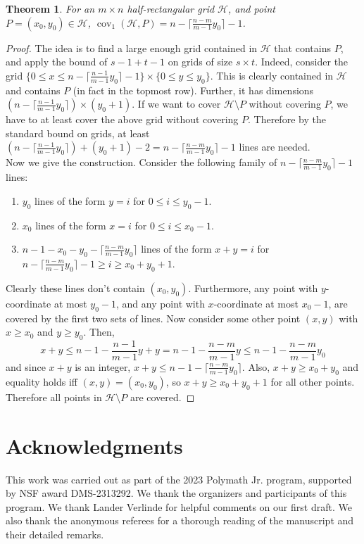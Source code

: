 \documentclass[usenames,dvipsnames, 11pt]{article}
\newtheorem{thm}{Theorem}
\numberwithin{thm}{section}
\theoremstyle{definition}
\theoremstyle{definition}
\theoremstyle{definition}
\newcommand{\cov}[1]{\operatorname{cov}_{#1}}
\newcommand{\1}{\mathbf{1}}
\def\cH{{\mathcal H}}
\begin{document}
\begin{thm}
    For an $m \times n$ half-rectangular grid $\cH$, and point $P=(x_0,y_0) \in \cH$, $\cov{1}(\cH, P)=n-\lceil \frac{n-m}{m-1} y_0 \rceil -1$.
\end{thm}
\begin{proof}
    The idea is to find a large enough grid contained in $\cH$ that contains $P$, and apply the bound of $s - 1 + t - 1$ on grids of size $s \times t$. 
    Indeed, consider the grid $\{0 \leq x \leq n-\lceil \frac{n-1}{m-1}y_0\rceil-1\} \times \{0 \leq y \leq y_0\}$. This is clearly contained in $\cH$ and contains $P$ (in fact in the topmost row). Further, it has dimensions $(n-\lceil \frac{n-1}{m-1}y_0\rceil) \times (y_0+1)$. If we want to cover $\cH \setminus P$ without covering $P$, we have to at least cover the above grid without covering $P$. Therefore by the standard bound on grids, at least $(n-\lceil \frac{n-1}{m-1}y_0\rceil) + (y_0+1)-2=n-\lceil \frac{n-m}{m-1} y_0 \rceil -1$ lines are needed. \\
    
    Now we give the construction. Consider the following family of $n-\lceil \frac{n-m}{m-1} y_0 \rceil -1$ lines:
    \begin{enumerate}
            \item $y_0$ lines of the form   $y=i$ for $0 \leq i \leq y_0-1$.
            \item $x_0$ lines of the form $x=i$ for $0 \leq i \leq x_0-1$.
            \item $n-1-x_0-y_0-\lceil \frac{n-m}{m-1} y_0 \rceil$ lines of the form $x+y=i$ for $n-\lceil \frac{n-m}{m-1} y_0 \rceil-1 \geq i \geq x_0+y_0+1$.
    \end{enumerate}
    Clearly these lines don't contain $(x_0,y_0)$. Furthermore, any point with $y$-coordinate at most $y_0-1$, and any point with $x$-coordinate at most $x_0-1$, are covered by the first two sets of lines. 
    Now consider some other point $(x,y)$ with $x \geq x_0$ and $y \geq y_0$. Then, $$x+y \leq n-1- \frac{n-1}{m-1}y+y = n-1-\frac{n-m}{m-1}y \leq n-1-\frac{n-m}{m-1}y_0$$
    and since $x+y$ is an integer, $x+y \leq n-1-\lceil \frac{n-m}{m-1} y_0 \rceil$. Also, $x+y \geq x_0+y_0$ and equality holds iff $(x,y)=(x_0,y_0)$, so $x+y \geq x_0+y_0+1$ for all other points. Therefore all points in $\cH \setminus P$ are covered.
\end{proof}




\section*{Acknowledgments}
This work was carried out as part of the 2023 Polymath Jr. program, supported by NSF award DMS-2313292.
We thank the organizers and participants of this program. 
We thank Lander Verlinde for helpful comments on our first draft.
We also thank the anonymous referees for a thorough reading of the manuscript and their detailed remarks. 
\end{document}
